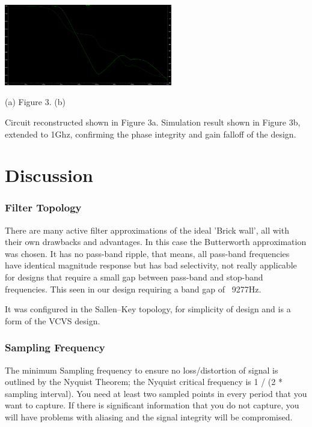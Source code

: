 \documentclass[11pt]{article}
\begin{document}
\begin{preview}
\includegraphics[width=0.55\textwidth]{images/spice_sim.png}
\begin{center}
        (a) \hspace*{0.2\textwidth} Figure 3. \hspace*{0.2\textwidth} (b)
\end{center}

Circuit reconstructed shown in Figure 3a. Simulation result shown in Figure 3b, extended to 1Ghz, confirming the phase integrity and gain falloff of the design.


\section*{Discussion}
\subsubsection*{Filter Topology}
There are many active filter approximations of the ideal 'Brick wall', all with their own drawbacks and advantages. 
In this case the Butterworth approximation was chosen. It has no pass-band ripple, that means, all pass-band frequencies have identical magnitude response but has bad selectivity, not really applicable for designs that require a small gap between pass-band and stop-band frequencies. This seen in our design requiring a band gap of ~9277Hz.


It was configured in the Sallen–Key topology, for simplicity of design and is a form of the VCVS design.
\subsubsection*{Sampling Frequency}
The minimum Sampling frequency to ensure no loss/distortion of signal is outlined by the Nyquist Theorem; the Nyquist critical frequency is 1 / (2 * sampling interval). You need at least two sampled points in every period that you want to capture. If there is significant information that you do not capture, you will have problems with aliasing and the signal integrity will be compromised.

\end{preview}
\end{document}
